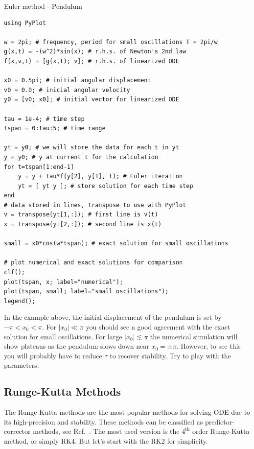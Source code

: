 \begin{example}{Euler method - Pendulum}
\label{ex:euler}
\begin{verbatim}
using PyPlot

w = 2pi; # frequency, period for small oscillations T = 2pi/w
g(x,t) = -(w^2)*sin(x); # r.h.s. of Newton's 2nd law
f(x,v,t) = [g(x,t); v]; # r.h.s. of linearized ODE

x0 = 0.5pi; # initial angular displacement
v0 = 0.0; # inicial angular velocity
y0 = [v0; x0]; # initial vector for linearized ODE

tau = 1e-4; # time step
tspan = 0:tau:5; # time range

yt = y0; # we will store the data for each t in yt
y = y0; # y at current t for the calculation
for t=tspan[1:end-1]
    y = y + tau*f(y[2], y[1], t); # Euler iteration
    yt = [ yt y ]; # store solution for each time step
end
# data stored in lines, transpose to use with PyPlot
v = transpose(yt[1,:]); # first line is v(t)
x = transpose(yt[2,:]); # second line is x(t)

small = x0*cos(w*tspan); # exact solution for small oscillations

# plot numerical and exact solutions for comparison
clf(); 
plot(tspan, x; label="numerical");
plot(tspan, small; label="small oscillations");
legend();
\end{verbatim}
\end{example}

In the example above, the initial displacement of the pendulum is set by $-\pi < x_0 < \pi$. For $|x_0| \ll \pi$ you should see a good agreement with the exact solution for small oscillations. For large $|x_0| \lesssim \pi$ the numerical simulation will show plateaus as the pendulum slows down near $x_0 = \pm \pi$. However, to see this you will probably have to reduce $\tau$ to recover stability. Try to play with the parameters.


\subsection{Runge-Kutta Methods}

The Runge-Kutta methods are the most popular methods for solving ODE due to its high-precision and stability. These methods can be classified as predictor-corrector methods, see Ref.~\cite{pang2006introduction}. The most used version is the $4^\text{th}$ order Runge-Kutta method, or simply RK4. But let's start with the RK2 for simplicity.

